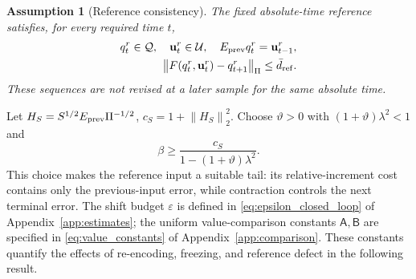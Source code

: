 \documentclass[journal]{IEEEtran}
\newtheorem{assumption}{Assumption}
\newcommand{\vu}{\mathbf{u}}
\newcommand{\norm}[1]{\left\lVert #1\right\rVert}
\begin{document}
\begin{assumption}[Reference consistency]
\label{ass:reference}
The fixed absolute-time reference satisfies, for every required time $t$,
\begin{equation}
\begin{split}
q_t^r\in\mathcal Q,\quad \vu_t^r\in\mathcal U,\quad
E_{\rm prev}q_t^r=\vu_{t-1}^r,\\
\norm{F(q_t^r,\vu_t^r)-q_{t+1}^r}_\Pi\le\bar d_{\rm ref}.
\end{split}
\label{eq:reference_defect}
\end{equation}
These sequences are not revised at a later sample for the same absolute time.
\end{assumption}

Let $H_S=S^{1/2}E_{\rm prev}\Pi^{-1/2}$, $c_S=1+\norm{H_S}_2^2$. Choose $\vartheta>0$ with $(1+\vartheta)\lambda^2<1$ and
\begin{equation}
\beta\ge\frac{c_S}{1-(1+\vartheta)\lambda^2}.
\label{eq:terminal_weight}
\end{equation}
This choice makes the reference input a suitable tail: its relative-increment cost contains only the previous-input error, while contraction controls the next terminal error. The shift budget $\varepsilon$ is defined in \eqref{eq:epsilon_closed_loop} of Appendix~\ref{app:estimates}; the uniform value-comparison constants $\mathsf A,\mathsf B$ are specified in \eqref{eq:value_constants} of Appendix~\ref{app:comparison}. These constants quantify the effects of re-encoding, freezing, and reference defect in the following result.
\end{document}
